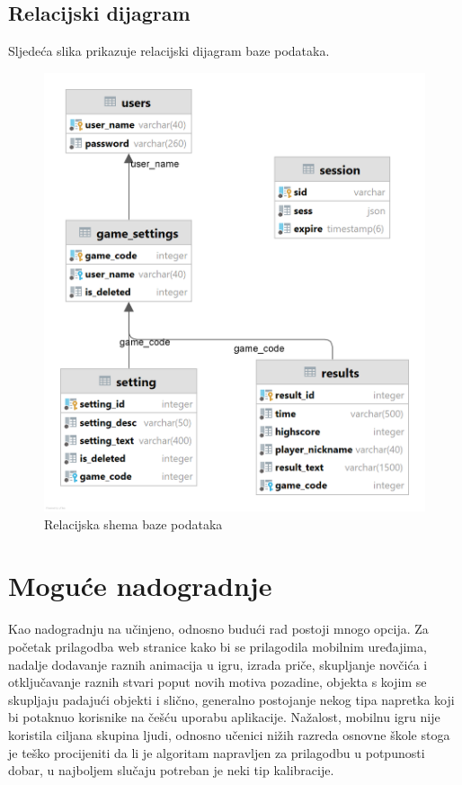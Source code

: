\documentclass[times, utf8, zavrsni]{fer}
\begin{document}
	\newpage
	\section{Relacijski dijagram}
		Sljedeća slika prikazuje relacijski dijagram baze podataka.
		\begin{figure}[H]
			\includegraphics[width=\linewidth]{"slike/REL.png"} 
			\centering
			\caption{Relacijska shema baze podataka}
			\label{fig:relshema}
		\end{figure}


\chapter{Moguće nadogradnje}
Kao nadogradnju na učinjeno, odnosno budući rad postoji mnogo opcija. Za početak prilagodba web stranice kako bi se prilagodila mobilnim uređajima, nadalje dodavanje raznih animacija u igru, izrada priče, skupljanje novčića
i otključavanje raznih stvari poput novih motiva pozadine, objekta s kojim se skupljaju padajući objekti i slično, generalno postojanje nekog tipa napretka koji bi potaknuo korisnike na češću uporabu aplikacije.
Nažalost, mobilnu igru nije koristila ciljana skupina ljudi, odnosno učenici nižih razreda osnovne škole stoga je teško procijeniti da li je algoritam napravljen za prilagodbu u potpunosti dobar, u najboljem slučaju potreban
je neki tip kalibracije. 
\end{document}
